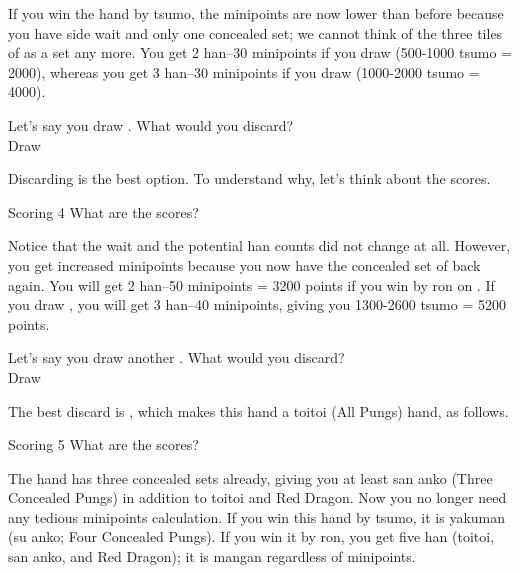 \bigskip
If you win the hand by {\jap tsumo}, the minipoints are now lower than before because you have side wait and only one concealed set; we cannot think of the three tiles of {\LARGE{}} as a set any more. You get 2 {\jap han}--30 minipoints if you draw {\LARGE{}} (500-1000 {\jap tsumo} = 2000), whereas you get 3 {\jap han}--30 minipoints if you draw {\LARGE{}} (1000-2000 {\jap tsumo} = 4000).

\bigskip

Let's say you draw {\LARGE{}}. What would you discard? 
\bp
{}\zhong\zhong\zhong~\\
\hfill\footnotesize{Draw~~~~~~~~~~~~~~~}
\ep

Discarding {\LARGE{}} is the best option. To understand why, let's think about the scores. 

\bigskip
\begin{itembox}[r]{Scoring 4}
\bp
{}\zhong\zhong\zhong
\ep
\vspace{-5pt} What are the scores?
\end{itembox}

\bigskip
Notice that the wait and the potential {\jap han} counts did not change at all. However, you get increased minipoints because you now have the concealed set of {\LARGE{}} back again. You will get 2 {\jap han}--50 minipoints = 3200 points if you win by {\jap ron} on {\LARGE{}}. If you draw {\LARGE{}}, you will get 3 {\jap han}--40 minipoints, giving you 1300-2600 {\jap tsumo} = 5200 points. 

\bigskip

Let's say you draw another {\LARGE{}}. What would you discard? 
\bp
{}\zhong\zhong\zhong~\\
\hfill\footnotesize{Draw~~~~~~~~~~~~~~~}
\ep

The best discard is {\LARGE{}}, which makes this hand a {\jap toitoi} (All Pungs) hand, as follows.
\bigskip
\begin{itembox}[r]{Scoring 5}
\bp
{}\zhong\zhong\zhong
\ep
\vspace{-5pt} What are the scores?
\end{itembox}

\bigskip
The hand has three concealed sets already, giving you at least {\jap san anko} (Three Concealed Pungs) in addition to {\jap toitoi} and Red Dragon. Now you no longer need any tedious minipoints calculation. If you win this hand by {\jap tsumo}, it is {\jap yakuman} ({\jap su anko}; Four Concealed Pungs). If you win it by {\jap ron}, you get five {\jap han} ({\jap toitoi}, {\jap san anko}, and Red Dragon); it is {\jap mangan} regardless of minipoints. 

